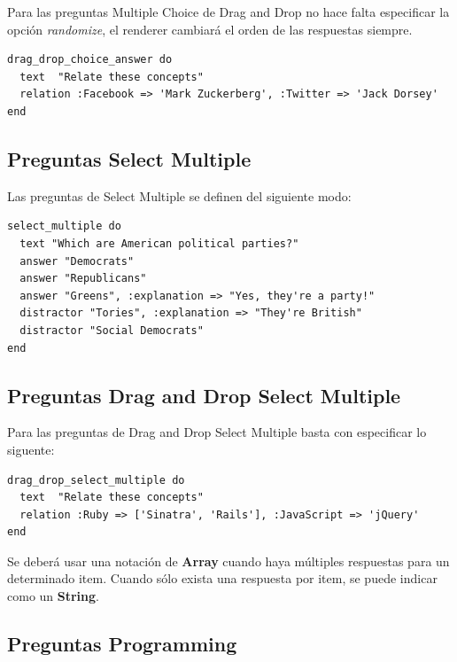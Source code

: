 Para las preguntas Multiple Choice de Drag and Drop no hace falta especificar la opci\'on \textit{randomize}, el renderer cambiar\'a el orden de las 
respuestas siempre.
\begin{verbatim}
drag_drop_choice_answer do
  text  "Relate these concepts"
  relation :Facebook => 'Mark Zuckerberg', :Twitter => 'Jack Dorsey'
end
\end{verbatim}

\subsection{Preguntas Select Multiple}
\label{subsec:Apendice2.6}

Las preguntas de Select Multiple se definen del siguiente modo:
\begin{verbatim}
select_multiple do
  text "Which are American political parties?"
  answer "Democrats"
  answer "Republicans"
  answer "Greens", :explanation => "Yes, they're a party!"
  distractor "Tories", :explanation => "They're British"
  distractor "Social Democrats"
end
\end{verbatim}

\subsection{Preguntas Drag and Drop Select Multiple}
\label{subsec:Apendice2.7}

Para las preguntas de Drag and Drop Select Multiple basta con especificar lo siguente:
\begin{verbatim}
drag_drop_select_multiple do
  text  "Relate these concepts"
  relation :Ruby => ['Sinatra', 'Rails'], :JavaScript => 'jQuery'
end
\end{verbatim}

Se deber\'a usar una notaci\'on de {\bfseries Array} cuando haya m\'ultiples respuestas para un determinado item. Cuando s\'olo exista una respuesta por item,
se puede indicar como un {\bfseries String}.

\subsection{Preguntas Programming}
\label{subsec:Apendice2.8}

